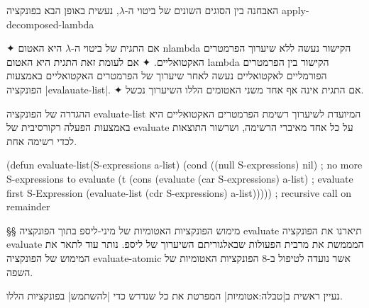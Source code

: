 האבחנה בין הסוגים השונים של ביטוי ה-$λ$, נעשית באופן הבא בפונקציה
apply-decomposed-lambda
\begin{itemize}
  ✦
  אם התגית של ביטוי ה-$λ$ היא האטום nlambda הקישור נעשה
  ללא שיערוך הפרמטרים
  האקטואליים.
  ✦ אם לעומת זאת התגית היא האטום lambda הקישור בין הפרמטרים הפורמליים
  לאקטואליים נעשה לאחר שיערוך של הפרמטרים האקטואליים באמצעות הפונקציה
  \E|evalauate-list|. ✦
  אם התגית אינה אף אחד משני האטומים הללו השיערוך נכשל.
\end{itemize}

ההגדרה של הפונקציה evaluate-list המיועדת לשיערוך רשימת הפרמטרים האקטואליים היא
באמצעות הפעלה רקורסיבית של evaluate על כל אחד מאיברי הרשימה, ושרשור התוצאות
לכדי רשימה אחת.
\begin{KERNEL}
(defun evaluate-list(S-expressions a-list)
  (cond ((null S-expressions) nil) ; no more S-expressions to evaluate
    (t (cons
          (evaluate (car S-expressions) a-list) ; evaluate first S-Expression
          (evaluate-list (cdr S-expressions) a-list))))) ; recursive call on remainder
\end{KERNEL}

§§ מימוש הפונקציות האטומיות של מיני-ליספ בתוך הפונקציה evaluate
תיארנו את הפונקציה evaluate המממשת את מרבית הפעולות שבאלגוריתם השיערוך של ליספ.
נותר עוד לתאר את המימוש של הפונקציה evaluate-atomic אשר נועדה לטיפול ב-8
הפונקציות האטומיות של השפה.

נעיין ראשית ב|טבלה:אטומיות| המפרטת את כל שנדרש כדי \ע|להשתמש| בפונקציות
הללו.

